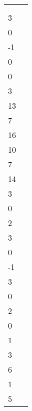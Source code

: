 \begin{applicationActivities}{3}{14}
\begin{activity}{15}
\begin{tabular}{ll}
 & \\
     \(\vspan\left\{
    \begin{bmatrix}2\\3\\0\\-1\end{bmatrix},
    \begin{bmatrix}2\\0\\0\\3\end{bmatrix},
    \begin{bmatrix}3\\13\\7\\16\end{bmatrix},
    \begin{bmatrix}-1\\10\\7\\14\end{bmatrix},
    \begin{bmatrix}4\\3\\0\\2\end{bmatrix}
    \right\}
    \)
 &
     \(\vspan\left\{
    \begin{bmatrix}2\\3\\0\\-1\end{bmatrix},
    \begin{bmatrix}4\\3\\0\\2\end{bmatrix},
    \begin{bmatrix}-3\\0\\1\\3\end{bmatrix},
    \begin{bmatrix}3\\6\\1\\5\end{bmatrix}
    \right\}
    \) \\


\end{tabular}
\end{activity}
\end{applicationActivities}

